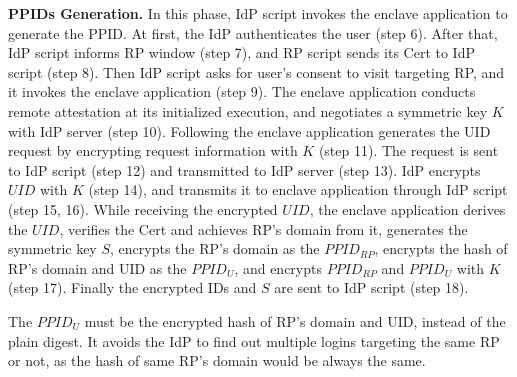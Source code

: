 \vspace{0.5mm}\noindent\textbf{PPIDs Generation.} In this phase, IdP script invokes the enclave application to generate the PPID. 
At first, the IdP authenticates the user (step 6). 
After that, IdP script informs RP window (step 7), and RP script sends its Cert to IdP script (step 8).  
Then IdP script asks for user's consent to visit targeting RP, and it invokes the enclave application (step 9). 
The enclave application conducts remote attestation at its initialized execution, and negotiates a symmetric key $K$ with IdP server (step 10).
Following the enclave application generates the UID request by encrypting request information with $K$ (step 11). 
The request is sent to IdP script (step 12) and transmitted to IdP server (step 13). 
IdP encrypts $UID$ with $K$ (step 14), and transmits it to enclave application through IdP script (step 15, 16).  
While receiving the encrypted $UID$, the enclave application derives the $UID$, verifies the Cert and achieves RP's domain from it, generates the symmetric key $S$, encrypts the RP's domain as the  $PPID_{RP}$, encrypts the hash of RP's domain and UID as the $PPID_U$, and encrypts $PPID_{RP}$ and $PPID_U$ with $K$ (step 17). 
Finally the encrypted IDs and $S$ are sent to IdP script (step 18). 

The $PPID_U$ must be the encrypted hash of RP's domain and UID, instead of the plain digest. It avoids the IdP to find out multiple logins targeting the same RP or not, as the hash of same RP's domain would be always the same. 

